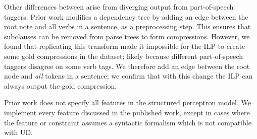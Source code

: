 \documentclass[11pt,a4paper]{article}
\begin{document}
Other differences between arise from diverging output from part-of-speech taggers. Prior work modifies a dependency tree by adding an edge between the root note and all verbs in a sentence, as a preprocessing step. This ensures that subclauses can be removed from parse trees to form compressions. However, we found that replicating this transform made it impossible for the ILP to create some gold compressions in the \citet{filippova2013overcoming} dataset; likely because different part-of-speech taggers disagree on some verb tags. We therefore add an edge between the root node and \textit{all} tokens in a sentence; we confirm that with this change the ILP can always output the gold compression.

Prior work does not specify all features in the structured perceptron model. We implement every feature discussed in the published work, except in cases where the feature or constraint assumes a syntactic formalism which is not compatible with UD.



\end{document}

